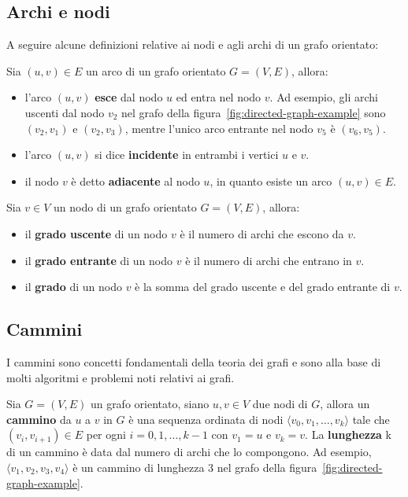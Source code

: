 \subsection{Archi e nodi}\label{subsec:archi-e-nodi-di-un-grafo-orientato}

A seguire alcune definizioni relative ai nodi e agli archi di un grafo orientato: \newline

Sia $(u, v) \in E$ un arco di un grafo orientato $G = (V, E)$, allora:
\begin{itemize}
    \item l'arco $(u, v)$ \textbf{esce} dal nodo $u$ ed {entra} nel nodo $v$.
        Ad esempio, gli archi uscenti dal nodo $v_2$ nel grafo della figura~\ref{fig:directed-graph-example}
        sono $(v_2, v_1)$ e $(v_2, v_3)$, mentre l'unico arco entrante nel nodo $v_5$ \`e $(v_6, v_5)$.
    \item l'arco $(u, v)$ si dice \textbf{incidente} in entrambi i vertici $u$ e $v$.
    \item il nodo $v$ \`e detto \textbf{adiacente} al nodo $u$, in quanto esiste un arco $(u, v) \in E$.
\end{itemize}

Sia $v \in V$ un nodo di un grafo orientato $G = (V, E)$, allora:
\begin{itemize}
    \item il \textbf{grado uscente} di un nodo $v$ \`e il numero di archi che escono da $v$.
    \item il \textbf{grado entrante} di un nodo $v$ \`e il numero di archi che entrano in $v$.
    \item il \textbf{grado} di un nodo $v$ \`e la somma del grado uscente e del grado entrante di $v$.
\end{itemize}

\subsection{Cammini}\label{subsec:cammini}

I cammini sono concetti fondamentali della teoria dei grafi e sono alla base di molti algoritmi e problemi noti
relativi ai grafi. \newline

Sia $G = (V, E)$ un grafo orientato, siano $u, v \in V$ due nodi di $G$, allora un \textbf{cammino} da $u$ a $v$ in $G$
\`e una sequenza ordinata di nodi $\langle v_0, v_1, \ldots, v_k \rangle$ tale che $(v_i, v_{i+1}) \in E$ per ogni
$i = 0, 1, \ldots, k-1$ con $v_1 = u$ e $v_k = v$.
La \textbf{lunghezza} k di un cammino \`e data dal numero di archi che lo compongono.
Ad esempio, $\langle v_1, v_2, v_3, v_4 \rangle$ \`e un cammino di lunghezza 3 nel grafo della
figura~\ref{fig:directed-graph-example}. \newline

